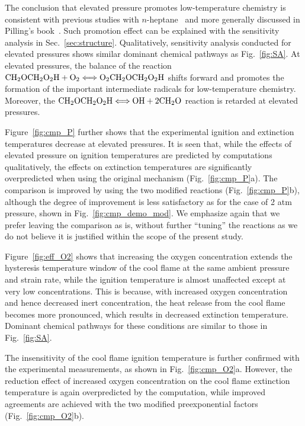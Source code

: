 \documentclass[review,3p,times]{elsarticle}
\begin{document}
\textcolor{Rev1}{The conclusion that elevated pressure promotes low-temperature chemistry is consistent with previous studies with $n$-heptane~\cite{ciezki93,law12} and more generally discussed in Pilling's book~\cite{pillingbook}}.  Such promotion effect can be explained with the sensitivity analysis in Sec.~\ref{sec:structure}.  Qualitatively, sensitivity analysis conducted for elevated pressures shows similar dominant chemical pathways as Fig.~\ref{fig:SA}.  At elevated pressures, the balance of the reaction $\rm{CH}_2\rm{OCH}_2\rm{O}_2\rm{H} + \rm{O}_2 \Longleftrightarrow \rm{O}_2\rm{CH}_2\rm{OCH}_2\rm{O}_2\rm{H}$ shifts forward and promotes the formation of the important intermediate radicals for low-temperature chemistry.  Moreover, the $\rm{CH}_2\rm{OCH}_2\rm{O}_2\rm{H} \Longleftrightarrow \rm{OH} + 2\rm{CH}_2\rm{O}$ reaction is retarded at elevated pressures.

Figure~\ref{fig:cmp_P} further shows that the experimental ignition and extinction temperatures decrease at elevated pressures.  It is seen that, while the effects of elevated pressure on ignition temperatures are predicted by computations qualitatively, the effects on extinction temperatures are significantly overpredicted when using the original mechanism (Fig.~\ref{fig:cmp_P}a).  The comparison is improved by using the two modified reactions (Fig.~\ref{fig:cmp_P}b), although the degree of improvement is less satisfactory as for the case of 2 atm pressure, shown in Fig.~\ref{fig:cmp_demo_mod}. We emphasize again that we prefer leaving the comparison as is, without further “tuning” the reactions as we do not believe it is justified within the scope of the present study. 

Figure~\ref{fig:eff_O2} shows that increasing the oxygen concentration extends the hysteresis temperature window of the cool flame at the same ambient pressure and strain rate, while the ignition temperature is almost unaffected except at very low concentrations.  This is because, with increased oxygen concentration and hence decreased inert concentration, the heat release from the cool flame becomes more pronounced, which results in decreased extinction temperature.  Dominant chemical pathways for these conditions are similar to those in Fig.~\ref{fig:SA}.

The insensitivity of the cool flame ignition temperature is further confirmed with the experimental measurements, as shown in Fig.~\ref{fig:cmp_O2}a.  However, the reduction effect of increased oxygen concentration on the cool flame extinction temperature is again overpredicted by the computation, while improved agreements are achieved with the two modified preexponential factors (Fig.~\ref{fig:cmp_O2}b).
\end{document}
